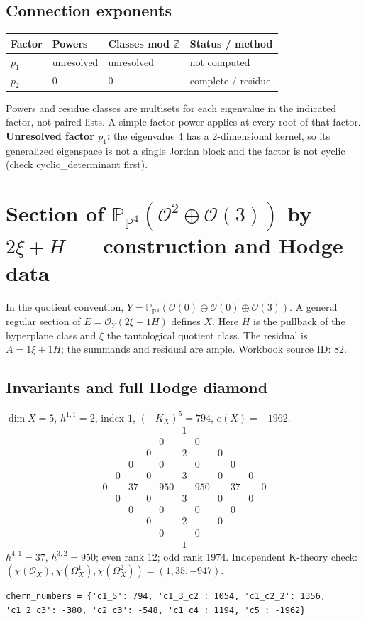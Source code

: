 \documentclass[10pt,a4paper]{article}
\begin{document}
\subsection*{Connection exponents}
\begin{center}\begin{tabular}{llll}\toprule Factor & Powers & Classes mod $\mathbb Z$ & Status / method\\\midrule
$p_{1}$ & unresolved & unresolved & not computed\\
$p_{2}$ & $0$ & $0$ & complete / residue\\
\bottomrule\end{tabular}\end{center}
Powers and residue classes are multisets for each eigenvalue in the indicated factor, not paired lists. A simple-factor power applies at every root of that factor.
\textbf{Unresolved factor $p_{1}$:} the eigenvalue 4 has a 2-dimensional kernel, so its generalized eigenspace is not a single Jordan block and the factor is not cyclic (check cyclic\_determinant first).
\clearpage\section*{Section of $\mathbb P_{\mathbb P^{4}}(\mathcal O^{2}\oplus \mathcal O(3))$ by $2\xi +H$ --- construction and Hodge data}\label{entry:PB5-082}
In the quotient convention, $Y=\mathbb P_{\mathbb P^{4}}(\mathcal O(0)\oplus\mathcal O(0)\oplus\mathcal O(3))$.
A general regular section of $E=\mathcal O_Y(2\xi+1H)$ defines $X$.
Here $H$ is the pullback of the hyperplane class and $\xi$ the tautological quotient class. The residual is $A=1\xi+1H$; the summands and residual are ample.
Workbook source ID: 82.
\subsection*{Invariants and full Hodge diamond}
$\dim X=5$, $h^{1,1}=2$, index $1$, $(-K_X)^5=794$, $e(X)=-1962$.
\[\begin{array}{ccccccccccc}&&&&&1&&&&&\\&&&&0&&0&&&&\\&&&0&&2&&0&&&\\&&0&&0&&0&&0&&\\&0&&0&&3&&0&&0&\\0&&37&&950&&950&&37&&0\\&0&&0&&3&&0&&0&\\&&0&&0&&0&&0&&\\&&&0&&2&&0&&&\\&&&&0&&0&&&&\\&&&&&1&&&&&\end{array}\]
$h^{4,1}=37$, $h^{3,2}=950$; even rank 12; odd rank 1974.
Independent K-theory check: $(\chi(\mathcal O_X),\chi(\Omega_X^1),\chi(\Omega_X^2))=(1, 35, -947)$.
\begin{lstlisting}
chern_numbers = {'c1_5': 794, 'c1_3_c2': 1054, 'c1_c2_2': 1356, 'c1_2_c3': -380, 'c2_c3': -548, 'c1_c4': 1194, 'c5': -1962}
\end{lstlisting}
\end{document}
